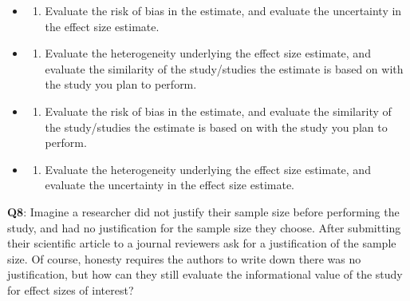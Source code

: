 \documentclass[
  letterpaper,
  DIV=11,
  numbers=noendperiod]{scrreprt}
\providecommand{\tightlist}{%
  \setlength{\itemsep}{0pt}\setlength{\parskip}{0pt}}\usepackage{longtable,booktabs,array}
\begin{document}
\begin{itemize}
\item
  \begin{enumerate}
  \def\labelenumi{(\Alph{enumi})}
  \tightlist
  \item
    Evaluate the risk of bias in the estimate, and evaluate the
    uncertainty in the effect size estimate.\\
  \end{enumerate}
\item
  \begin{enumerate}
  \def\labelenumi{(\Alph{enumi})}
  \setcounter{enumi}{1}
  \tightlist
  \item
    Evaluate the heterogeneity underlying the effect size estimate, and
    evaluate the similarity of the study/studies the estimate is based
    on with the study you plan to perform.\\
  \end{enumerate}
\item
  \begin{enumerate}
  \def\labelenumi{(\Alph{enumi})}
  \setcounter{enumi}{2}
  \tightlist
  \item
    Evaluate the risk of bias in the estimate, and evaluate the
    similarity of the study/studies the estimate is based on with the
    study you plan to perform.\\
  \end{enumerate}
\item
  \begin{enumerate}
  \def\labelenumi{(\Alph{enumi})}
  \setcounter{enumi}{3}
  \tightlist
  \item
    Evaluate the heterogeneity underlying the effect size estimate, and
    evaluate the uncertainty in the effect size estimate.\\
  \end{enumerate}
\end{itemize}

\textbf{Q8}: Imagine a researcher did not justify their sample size
before performing the study, and had no justification for the sample
size they choose. After submitting their scientific article to a journal
reviewers ask for a justification of the sample size. Of course, honesty
requires the authors to write down there was no justification, but how
can they still evaluate the informational value of the study for effect
sizes of interest?
\end{document}
